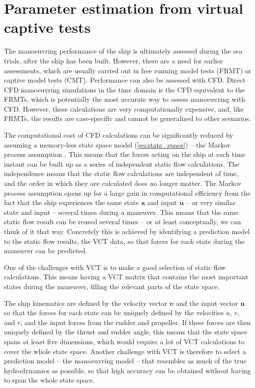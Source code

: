 \section{Parameter estimation from virtual captive tests} \label{sec:VCT}
The manoeuvring performance of the ship is ultimately assessed during the sea trials, after the ship has been built. However, there are a need for earlier assessments, which are usually carried out in free running model tests (FRMT) or captive model tests (CMT). Performance can also be assessed with CFD. Direct CFD manoeuvring simulations in the time domain \cite{el_moctar_rans-based_2014} is the CFD equivalent to the FRMTs, which is potentially the most accurate way to assess manoeuvring with CFD. However, these calculations are very computationally expensive, and, like FRMTs, the results are case-specific and cannot be generalized to other scenarios. 

The computational cost of CFD calculations can be significantly reduced by assuming a memory-less state space model (\autoref{eq:state_space}) -- the Markov process assumption \cite{yoon_identification_2003}. This means that the forces acting on the ship at each time instant can be built up as a series of independent static flow calculations. 
The independence means that the static flow calculations are independent of time, and the order in which they are calculated does no longer matter. The Markov process assumption opens up for a large gain in computational efficiency from the fact that the ship experiences the same state $\mathbf{x}$ and input $\mathbf{u}$ -- or very similar state and input -- several times during a maneuver. This means that the same static flow result can be reused several times -- or at least conceptually, we can think of it that way. Concretely this is achieved by identifying a prediction model to the static flow results, the VCT data, so that forces for each state during the maneuver can be predicted. 

One of the challenges with VCT is to make a good selection of static flow calculations. This means having a VCT matrix that contains the most important states during the maneuver, filling the relevant parts of the state space.  

The ship kinematics are defined by the velocity vector $\pmb{\bm{\upsilon}}$ and the input vector $\mathbf{u}$ so that the forces for each state can be uniquely defined by the velocities $u$, $v$, and $r$, and the input forces from the rudder and propeller. If these forces are then uniquely defined by the thrust and rudder angle, this means that the state space spans at least five dimensions, which would require a lot of VCT calculations to cover the whole state space.
Another challenge with VCT is therefore to select a prediction model -- the manoeuvring model -- that resembles as much of the true hydrodynamics as possible, so that high accuracy can be obtained without having to span the whole state space.  

